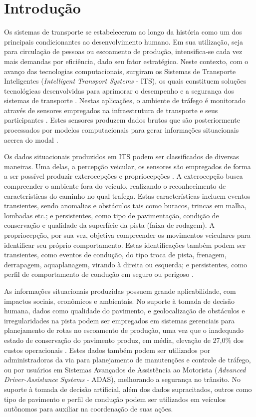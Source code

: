 \chapter{Introdução}
\label{cap:introducao}

Os sistemas de transporte se estabeleceram ao longo da história como um dos principais condicionantes ao desenvolvimento humano. Em sua utilização, seja para circulação de pessoas ou escoamento de produção, intensifica-se cada vez mais demandas por eficiência, dado seu fator estratégico. Neste contexto, com o avanço das tecnologias computacionais, surgiram os Sistemas de Transporte Inteligentes (\textit{Intelligent Transport Systems} - ITS), os quais constituem soluções tecnológicas desenvolvidas para aprimorar o desempenho e a segurança dos sistemas de transporte \cite{Zhang2011,Aragon2016}. Nestas aplicações, o ambiente de tráfego é monitorado através de sensores empregados na infraestrutura de transporte e seus participantes \cite{Zhang2011,mathew2014a,mathew2014b}. Estes sensores produzem dados brutos que são posteriormente processados por modelos computacionais para gerar informações situacionais acerca do modal \cite{Zhang2011}.

Os dados situacionais produzidos em ITS podem ser classificados de diversas maneiras. Uma delas, a percepção veicular, os sensores são empregados de forma a ser possível produzir exterocepções e propriocepções \cite{menegazzo2020}. A exterocepção busca compreender o ambiente fora do veículo, realizando o reconhecimento de características do caminho no qual trafega. Estas características incluem eventos transientes, sendo anomalias e obstáculos tais como buracos, trincas em malha, lombadas etc.; e persistentes, como tipo de pavimentação, condição de conservação e qualidade da superfície da pista (faixa de rodagem). A propriocepção, por sua vez, objetiva compreender os movimentos veiculares para identificar seu próprio comportamento. Estas identificações também podem ser transientes, como eventos de condução, do tipo troca de pista, frenagem, derrapagem, aquaplanagem, virando à direita ou esquerda; e persistentes, como perfil de comportamento de condução em seguro ou perigoso \cite{menegazzo2018,menegazzo2020}.

As informações situacionais produzidas possuem grande aplicabilidade, com impactos sociais, econômicos e ambientais. No suporte à tomada de decisão humana, dados como qualidade do pavimento, e geolocalização de obstáculos e irregularidades na pista podem ser empregados em sistemas gerenciais para planejamento de rotas no escoamento de produção, uma vez que o inadequado estado de conservação do pavimento produz, em média, elevação de 27,0\% dos custos operacionais \cite{CNT2017}. Estes dados também podem ser utilizados por administradoras da via para planejamento de manutenções e controle de tráfego, ou por usuários em Sistemas Avançados de Assistência ao Motorista (\textit{Advanced Driver-Assistance Systems} - ADAS), melhorando a segurança no trânsito. No suporte à tomada de decisão artificial, além dos dados supracitados, outros como tipo de pavimento e perfil de condução podem ser utilizados em veículos autônomos para auxiliar na coordenação de suas ações.

